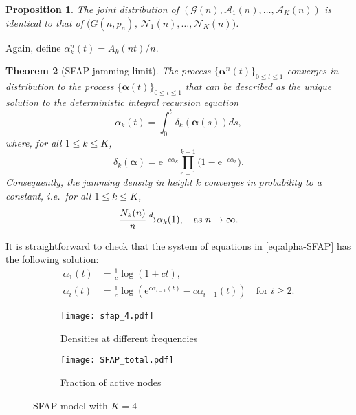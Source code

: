 \documentclass[11pt,a4paper, reqno]{article}
\newtheorem{theorem}{Theorem}
\newtheorem{proposition}[theorem]{Proposition}
\begin{document}
\begin{proposition}\label{prop:sfap}
The joint distribution of  $(\mathcal{G}(n),\mathcal{A}_1(n),\ldots,\mathcal{A}_K(n))$ is identical to that of $(G(n,p_n)$, $\mathcal{N}_1(n),\ldots, \mathcal{N}_K(n))$.
\end{proposition}
Again, define $\alpha_k^n(t)=A_k(nt)/n$.
\begin{theorem}[{SFAP jamming limit}]\label{th:sfap}
The process $\{{\ensuremath{\boldsymbol{{\alpha}}}}^n(t)\}_{0\leq t\leq1}$ converges in distribution  to the process $\{{\ensuremath{\boldsymbol{{\alpha}}}}(t)\}_{0\leq t\leq 1}$ that can be described as the unique solution to the  deterministic integral recursion equation
\begin{equation}\label{eq:alpha-SFAP}
 \alpha_k(t)=\int_0^t\delta_k({\ensuremath{\boldsymbol{{\alpha}}}}(s))ds,
\end{equation} where, for all $1\leq k\leq K$,
\begin{equation}\label{eq:delta-sfap}
 \delta_k({\ensuremath{\boldsymbol{{\alpha}}}})={\ensuremath{\mathrm{e}}}^{-c\alpha_k}\prod_{r=1}^{k-1}\big(1-{\ensuremath{\mathrm{e}}}^{-c\alpha_r}\big).
\end{equation}
 Consequently, the jamming density in height $k$ converges in probability to a constant, i.e.~for all $1\leq k\leq K$,
\begin{equation}
\frac{N_k(n)}{n}{\ensuremath{\xrightarrow{d}}} \alpha_k(1), \quad {\rm as} \ n\to\infty.
\end{equation}
\end{theorem}
It is straightforward to check that the system of equations in \eqref{eq:alpha-SFAP} has the following solution:
\begin{equation}\label{eq:tetris}
\begin{split}
\alpha_1(t)&=\frac{1}{c}\log(1+ct),\\
\alpha_i(t)&=\frac{1}{c}\log({\ensuremath{\mathrm{e}}}^{c\alpha_{i-1}(t)}-c\alpha_{i-1}(t))\quad\mbox{for }i\geq 2.
\end{split}
\end{equation}

\begin{figure}
\begin{subfigure}{.5\textwidth}
  \centering
  \texttt{[image: sfap\_4.pdf]}
  \caption{Densities at different frequencies}
  \label{fig:SFAP}
\end{subfigure}\begin{subfigure}{.5\textwidth}
  \centering
  \texttt{[image: SFAP\_total.pdf]}
  \caption{Fraction of active nodes}
  \label{fig:SFAP-total}
\end{subfigure}
\caption{SFAP  model with $K=4$}
\end{figure}
\end{document}
